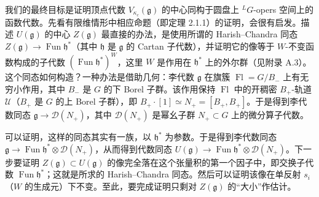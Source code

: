 我们的最终目标是证明顶点代数 $V_{\kappa_c}(\mathfrak{g})$ 的中心同构于圆盘上 ${}^LG$-opers 空间上的函数代数。先看有限维情形中相应命题（即定理 2.1.1）的证明，会很有启发。描述 $U(\mathfrak{g})$ 的中心 $Z(\mathfrak{g})$ 最直接的办法，是使用所谓的 Harish--Chandra 同态 $Z(\mathfrak{g})\to\operatorname{Fun}\mathfrak{h}^*$（其中 $\mathfrak{h}$ 是 $\mathfrak{g}$ 的 Cartan 子代数），并证明它的像等于 $W$-不变函数构成的子代数 $(\operatorname{Fun}\mathfrak{h}^*)^W$，这里 $W$ 是作用在 $\mathfrak{h}^*$ 上的外尔群（见附录 A.3）。这个同态如何构造？一种办法是借助几何：李代数 $\mathfrak{g}$ 在旗簇 $\operatorname{Fl}=G/B_-$ 上有无穷小作用，其中 $B_-$ 是 $G$ 的下 Borel 子群。该作用保持 $\operatorname{Fl}$ 中的开稠密 $B_+$-轨道 $\mathcal{U}$（$B_+$ 是 $G$ 的上 Borel 子群），即 $B_+\cdot[1]\simeq N_+=[B_+,B_+]$。于是得到李代数同态 $\mathfrak{g}\to\mathcal{D}(N_+)$，其中 $\mathcal{D}(N_+)$ 是幂幺子群 $N_+\subset G$ 上的微分算子代数。


可以证明，这样的同态其实有一族，以 $\mathfrak{h}^*$ 为参数。于是得到李代数同态 $\mathfrak{g}\to\operatorname{Fun}\mathfrak{h}^*\otimes\mathcal{D}(N_+)$，从而得到代数同态 $U(\mathfrak{g})\to\operatorname{Fun}\mathfrak{h}^*\otimes\mathcal{D}(N_+)$。下一步要证明 $Z(\mathfrak{g})\subset U(\mathfrak{g})$ 的像完全落在这个张量积的第一个因子中，即交换子代数 $\operatorname{Fun}\mathfrak{h}^*$；这就是所求的 Harish--Chandra 同态。然后可以证明该像在单反射 $s_i$（$W$ 的生成元）下不变。至此，要完成证明只剩对 $Z(\mathfrak{g})$ 的“大小”作估计。


